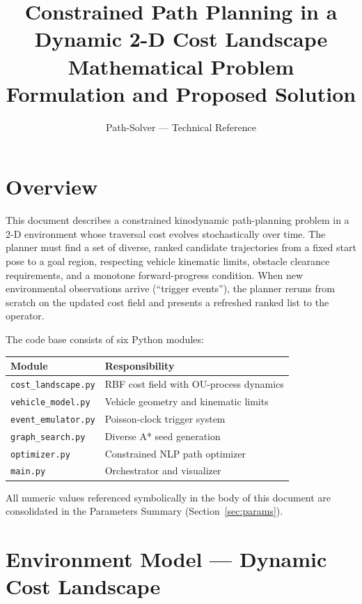 \documentclass[11pt,a4paper]{article}
\title{\textbf{Constrained Path Planning in a Dynamic 2-D Cost Landscape}\\[0.4em]
\large Mathematical Problem Formulation and Proposed Solution}
\author{Path-Solver --- Technical Reference}
\date{}
\begin{document}
\maketitle
\tableofcontents
\bigskip

\section{Overview}

This document describes a constrained kinodynamic path-planning problem in a
2-D environment whose traversal cost evolves stochastically over time.
The planner must find a set of diverse, ranked candidate trajectories from a
fixed start pose to a goal region, respecting vehicle kinematic limits,
obstacle clearance requirements, and a monotone forward-progress condition.
When new environmental observations arrive (``trigger events''), the planner
reruns from scratch on the updated cost field and presents a refreshed ranked
list to the operator.

The code base consists of six Python modules:

\begin{center}
\begin{tabular}{ll}
\toprule
Module & Responsibility \\
\midrule
\texttt{cost\_landscape.py} & RBF cost field with OU-process dynamics \\
\texttt{vehicle\_model.py}  & Vehicle geometry and kinematic limits \\
\texttt{event\_emulator.py} & Poisson-clock trigger system \\
\texttt{graph\_search.py}   & Diverse A* seed generation \\
\texttt{optimizer.py}       & Constrained NLP path optimizer \\
\texttt{main.py}            & Orchestrator and visualizer \\
\bottomrule
\end{tabular}
\end{center}

All numeric values referenced symbolically in the body of this document are
consolidated in the Parameters Summary (Section~\ref{sec:params}).

\section{Environment Model --- Dynamic Cost Landscape}
\end{document}
